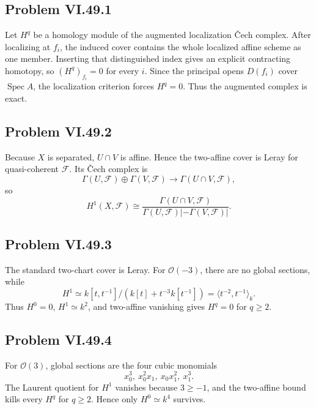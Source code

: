 \subsection*{Problem VI.49.1}
\begin{solution}
Let \(H^q\) be a homology module of the augmented localization Čech complex.  After localizing at \(f_i\), the induced cover contains the whole localized affine scheme as one member.  Inserting that distinguished index gives an explicit contracting homotopy, so \((H^q)_{f_i}=0\) for every \(i\).  Since the principal opens \(D(f_i)\) cover \(\operatorname{Spec}A\), the localization criterion forces \(H^q=0\).  Thus the augmented complex is exact.
\end{solution}

\subsection*{Problem VI.49.2}
\begin{solution}
Because \(X\) is separated, \(U\cap V\) is affine.  Hence the two-affine cover is Leray for quasi-coherent \(\mathcal F\).  Its Čech complex is
\[
\Gamma(U,\mathcal F)\oplus\Gamma(V,\mathcal F)\to\Gamma(U\cap V,\mathcal F),
\]
so
\[
H^1(X,\mathcal F)\cong
\frac{\Gamma(U\cap V,\mathcal F)}
{\Gamma(U,\mathcal F)|-\Gamma(V,\mathcal F)|}.
\]
\end{solution}

\subsection*{Problem VI.49.3}
\begin{solution}
The standard two-chart cover is Leray.  For \(\mathcal O(-3)\), there are no global sections, while
\[
H^1\simeq
k[t,t^{-1}]/(k[t]+t^{-3}k[t^{-1}])
=\langle t^{-2},t^{-1}\rangle_k.
\]
Thus \(H^0=0\), \(H^1\simeq k^2\), and two-affine vanishing gives \(H^q=0\) for \(q\ge2\).
\end{solution}

\subsection*{Problem VI.49.4}
\begin{solution}
For \(\mathcal O(3)\), global sections are the four cubic monomials
\[
x_0^3,\ x_0^2x_1,\ x_0x_1^2,\ x_1^3.
\]
The Laurent quotient for \(H^1\) vanishes because \(3\ge-1\), and the two-affine bound kills every \(H^q\) for \(q\ge2\).  Hence only \(H^0\simeq k^4\) survives.
\end{solution}

